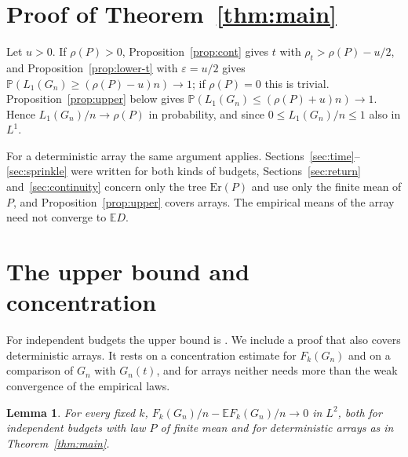\documentclass[11pt]{amsart}
\newtheorem{lemma}[theorem]{Lemma}
\theoremstyle{remark}
\numberwithin{equation}{section}
\newcommand{\E}{\mathbb E}
\newcommand{\Pp}{\mathbb P}
\newcommand{\1}{\mathbf 1}
\newcommand{\Er}{\mathrm{Er}}
\begin{document}
\section{Proof of Theorem~\ref{thm:main}}\label{sec:proof}

Let $u>0$. If $\rho(P)>0$, Proposition~\ref{prop:cont} gives $t$ with $\rho_t>\rho(P)-u/2$, and Proposition~\ref{prop:lower-t} with $\varepsilon=u/2$ gives $\Pp(L_1(G_n)\ge(\rho(P)-u)n)\to1$; if $\rho(P)=0$ this is trivial. Proposition~\ref{prop:upper} below gives $\Pp(L_1(G_n)\le(\rho(P)+u)n)\to1$. Hence $L_1(G_n)/n\to\rho(P)$ in probability, and since $0\le L_1(G_n)/n\le1$ also in $L^1$.

For a deterministic array the same argument applies. Sections~\ref{sec:time}--\ref{sec:sprinkle} were written for both kinds of budgets, Sections~\ref{sec:return} and~\ref{sec:continuity} concern only the tree $\Er(P)$ and use only the finite mean of $P$, and Proposition~\ref{prop:upper} covers arrays. The empirical means of the array need not converge to $\E D$.

\section{The upper bound and concentration}\label{sec:upper}

For independent budgets the upper bound is \cite[Corollary~2.2]{EWT}. We include a proof that also covers deterministic arrays. It rests on a concentration estimate for $F_k(G_n)$ and on a comparison of $G_n$ with $G_n(t)$, and for arrays neither needs more than the weak convergence of the empirical laws.

\begin{lemma}\label{lem:conc}
For every fixed $k$, $F_k(G_n)/n-\E F_k(G_n)/n\to0$ in $L^2$, both for independent budgets with law $P$ of finite mean and for deterministic arrays as in Theorem~\ref{thm:main}.
\end{lemma}
\end{document}
